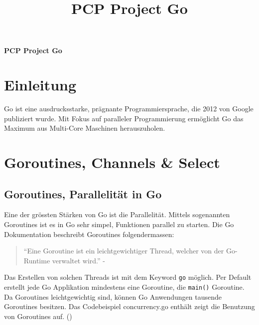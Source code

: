 \documentclass[11pt]{article}
\title{PCP Project Go}
\begin{document}
\begin{center}
\textbf{\Large PCP Project Go}    
\end{center}


\section{Einleitung}
Go ist eine ausdrucksstarke, prägnante Programmiersprache, die 2012 von Google publiziert wurde. Mit Fokus auf paralleler Programmierung ermöglicht Go das Maximum aus Multi-Core Maschinen herauszuholen.

\section{Goroutines, Channels \& Select}
\subsection{Goroutines, Parallelität in Go}
Eine der grössten Stärken von Go ist die Parallelität. Mittels sogenannten Goroutines ist es in Go sehr simpel, Funktionen parallel zu starten. Die Go Dokumentation beschreibt Goroutines folgendermassen: \begin{quote}
``Eine Goroutine ist ein leichtgewichtiger Thread, welcher von der Go-Runtime verwaltet wird.'' -  \cite{ATourofG52:online}
\end{quote} 

Das Erstellen von solchen Threads ist mit dem Keyword \lstinline{go} möglich.
Per Default erstellt jede Go Applikation mindestens eine Goroutine, die \lstinline{main()} Goroutine. Da Goroutines leichtgewichtig sind, können Go Anwendungen tausende Goroutines besitzen. Das Codebeispiel concurrency.go enthält zeigt die Benutzung von Goroutines auf. (\cite{Anatomyo74:online})
\end{document}
